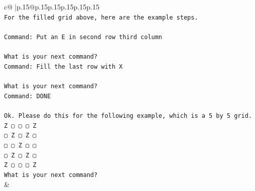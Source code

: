 \documentclass{article}
\begin{document}
{\begin{supertabular}{c@{$\;$}|p{.15\linewidth}@{}p{.15\linewidth}p{.15\linewidth}p{.15\linewidth}p{.15\linewidth}p{.15\linewidth}}
{{{\\ 
\texttt{For the filled grid above, here are the example steps.} \\
\\ 
\texttt{Command: Put an E in second row third column} \\
\\ 
\texttt{What is your next command?} \\
\texttt{Command: Fill the last row with X} \\
\\ 
\texttt{What is your next command?} \\
\texttt{Command: DONE} \\
\\ 
\texttt{Ok. Please do this for the following example, which is a 5 by 5 grid.} \\
\texttt{Z ▢ ▢ ▢ Z} \\
\texttt{▢ Z ▢ Z ▢} \\
\texttt{▢ ▢ Z ▢ ▢} \\
\texttt{▢ Z ▢ Z ▢} \\
\texttt{Z ▢ ▢ ▢ Z} \\
\texttt{What is your next command?} \\
            }
        }
    }
    & \\ \\


\end{supertabular}}
\end{document}
